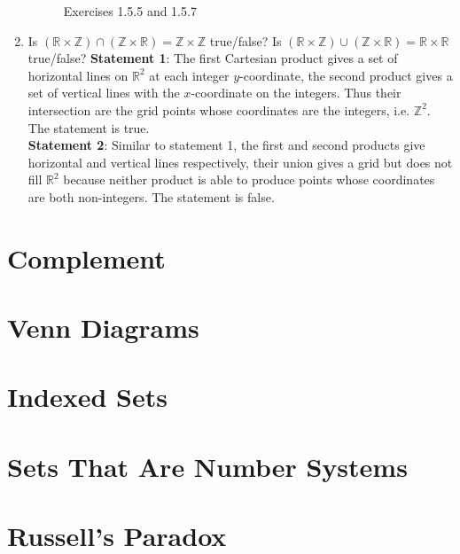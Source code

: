 \documentclass[10pt]{article}
\newcommand{\R}{\mathbb{R}}
\newcommand{\Z}{\mathbb{Z}}
\theoremstyle{definition}
\begin{document}
\begin{enumerate}
\begin{figure}
                \caption{Exercises 1.5.5 and 1.5.7}
            \end{figure}
        \item Is $(\R\times\Z)\cap(\Z\times\R)=\Z\times\Z$ true/false? Is $(\R\times\Z)\cup(\Z\times\R)=\R\times\R$ true/false?
            \textbf{Statement 1}: The first Cartesian product gives a set of horizontal lines on $\R^2$ at each integer $y$-coordinate, the second product gives a set of vertical lines with the $x$-coordinate on the integers. Thus their intersection are the grid points whose coordinates are the integers, i.e. $\Z^2$. The statement is true.\\
            \textbf{Statement 2}: Similar to statement 1, the first and second products give horizontal and vertical lines respectively, their union gives a grid but does not fill $\R^2$ because neither product is able to produce points whose coordinates are both non-integers. The statement is false.
    \end{enumerate}

    \section{Complement}

    \section{Venn Diagrams}

    \section{Indexed Sets}

    \section{Sets That Are Number Systems}

    \section{Russell's Paradox}

    
\end{document}
